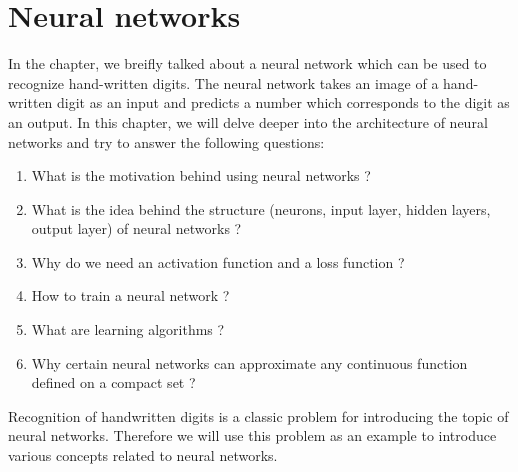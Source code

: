 \chapter{Neural networks} %

\label{Chapter3} %
\setcounter{chapter}{3}
In the  chapter, we breifly talked about a neural network which can be used 
to recognize hand-written digits. The neural network takes an image of a hand-written digit as 
an input and predicts a number which corresponds to the digit as an output. In this chapter, 
we will delve deeper into the architecture of neural networks and try to answer the following questions:
\begin{enumerate}
    \item What is the motivation behind using neural networks ?
    \item What is the idea behind the structure (neurons, input layer, hidden layers, output layer) 
    of neural networks ?
    \item Why do we need an activation function and a loss function ?
    \item How to train a neural network ?
    \item What are learning algorithms ?
    \item Why certain neural networks can approximate any continuous function defined on a compact set ?
\end{enumerate}
Recognition of handwritten digits is a classic problem for introducing the topic of neural networks. Therefore 
we will use this problem as an example to introduce various concepts related to neural networks.
  
